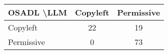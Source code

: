 \begin{tabular}{l|cc}\hline
	\textbf{OSADL \textbackslash LLM} & Copyleft & Permissive\\\hline
	Copyleft & 22 & 19\\
	Permissive & 0 & 73\\\hline
\end{tabular}
